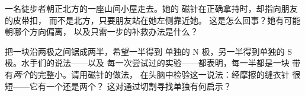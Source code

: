 \begin{exercise}[$\star\star$]\label{exo:g4:magnets-and-compass:10}
一名徒步者朝正北方的一座山间小屋走去。她的
磁针在正确拿持时，却指向朋友的皮带扣，
而不是北方，只要朋友站在她左侧靠近她。
这是怎么回事？她有可能朝哪个方向偏离，
以及只需一步的补救办法是什么？
\end{exercise}

\begin{exercise}[$\star\star$]\label{exo:g4:magnets-and-compass:11}
把一块沿两极之间锯成两半，希望一半得到
单独的 N 极，另一半得到单独的 S 极。水手们的说法——以及
每一次尝试过的实验——都表明，每一半都是一块
带有\emph{两个}的完整小。请用磁针的做法，
在头脑中检验这一说法：经摩擦的缝衣针
很短——它有一个还是两个？
这对通过切割寻找单独有何启示？
\end{exercise}
